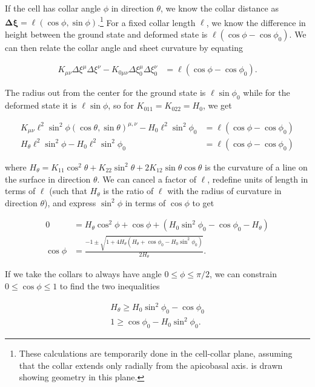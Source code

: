 If the cell has collar angle $\phi$ in direction $\theta$, we know the collar distance as $\bm{\Delta\xi} = \ell(\cos\phi, \sin\phi)$.\footnote{These calculations are temporarily done in the cell-collar plane, assuming that the collar extends only radially from the apicobasal axis.  is drawn showing geometry in this plane.} 
For a fixed collar length $\ell$, we know the difference in height between the ground state and deformed state is $\ell(\cos\phi - \cos\phi_0)$. 
We can then relate the collar angle and sheet curvature by equating 

\begin{align}
    K_{\mu\nu}\Delta\xi^\mu\Delta\xi^\nu - K_{0\mu\nu}\Delta\xi_0^\mu\Delta\xi_0^\nu &= \ell(\cos\phi - \cos\phi_0). \label{eq:base}
\end{align}

The radius out from the center for the ground state is $\ell\sin\phi_0$ while for the deformed state it is $\ell\sin\phi$, so for $K_{011}=K_{022}=H_0$, we get

\begin{align*}
    K_{\mu\nu}\ell^2\sin^2\phi (\cos\theta, \sin\theta)^{\mu,\nu} - H_0 \ell^2\sin^2\phi_0 &= \ell(\cos\phi - \cos\phi_0) \\
    H_\theta \ell^2\sin^2\phi - H_0 \ell^2\sin^2\phi_0 &= \ell(\cos\phi - \cos\phi_0)
\end{align*}

\noindent where $H_\theta = K_{11}\cos^2\theta + K_{22}\sin^2\theta + 2K_{12}\sin\theta\cos\theta$ is the curvature of a line on the surface in direction $\theta$. 
We can cancel a factor of $\ell$, redefine units of length in terms of $\ell$ (such that $H_\theta$ is the ratio of $\ell$ with the radius of curvature in direction $\theta$), and express $\sin^2\phi$ in terms of $\cos\phi$ to get

\begin{align*}
    0 &= H_\theta \cos^2\phi + \cos\phi + (H_0\sin^2\phi_0 - \cos\phi_0 - H_\theta) \\
    \cos\phi &= \frac{-1 \pm \sqrt{1 + 4H_\theta (H_\theta + \cos\phi_0 - H_0\sin^2\phi_0)}}{2H_\theta}.
\end{align*}

If we take the collars to always have angle $0 \leq \phi \leq \pi/2$, we can constrain $0 \leq \cos\phi \leq 1$ to find the two inequalities 

\begin{align}
    H_\theta \geq H_0 \sin^2\phi_0 - \cos\phi_0 \label{eq:ineq1}\\
    1 \geq \cos\phi_0 - H_0 \sin^2\phi_0. \label{eq:ineq2}
\end{align}

